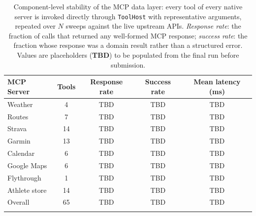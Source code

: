 \begin{table}[ht]
\begin{center}
\begin{minipage}{\textwidth}
\caption[Component and API stability results (placeholder)]{Component-level stability of the MCP data layer: every tool of every native server is invoked directly through \texttt{ToolHost} with representative arguments, repeated over $N$ sweeps against the live upstream APIs. \textit{Response rate}: the fraction of calls that returned any well-formed MCP response; \textit{success rate}: the fraction whose response was a domain result rather than a structured error. Values are placeholders (\textbf{TBD}) to be populated from the final run before submission.}\label{tab:stability}
\begin{tabularx}{\textwidth}{Xcccc}
\toprule
\textbf{MCP Server} & \textbf{Tools} & \textbf{Response rate} & \textbf{Success rate} & \textbf{Mean latency (ms)} \\
\midrule
Weather & 4 & TBD & TBD & TBD \\
Routes & 7 & TBD & TBD & TBD \\
Strava & 14 & TBD & TBD & TBD \\
Garmin & 13 & TBD & TBD & TBD \\
Calendar & 6 & TBD & TBD & TBD \\
Google Maps & 6 & TBD & TBD & TBD \\
Flythrough & 1 & TBD & TBD & TBD \\
Athlete store & 14 & TBD & TBD & TBD \\
\midrule
Overall & 65 & TBD & TBD & TBD \\
\botrule
\end{tabularx}
\end{minipage}
\end{center}
\end{table}
